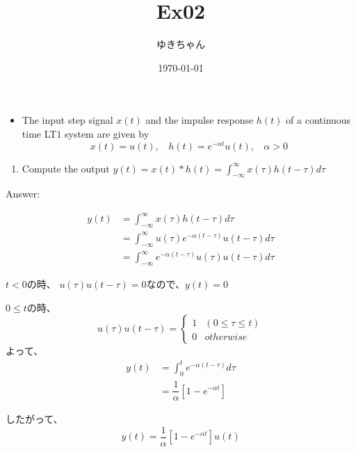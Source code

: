 \documentclass[a4paper,16pt]{jsarticle}
\title{Ex02}
\author{ゆきちゃん}
\date{\today}
\begin{document}
\maketitle

\begin{itemize}
	\item The input step signal $x(t)$ and the impulse response $h(t)$ of a continuous time LT$1$ system are given by
	\begin{equation}
		x(t) = u(t),~~~~h(t) = e^{-\alpha t}u(t),~~~~\alpha > 0
	\end{equation}
\end{itemize}

\begin{enumerate}
	\item Compute the output $y(t) = x(t)*h(t) = \int_{-\infty}^\infty x(\tau)h(t-\tau) d\tau$
\end{enumerate}

Answer:

\begin{align}
	y(t) &= \int_{-\infty}^\infty x(\tau)h(t-\tau) d\tau \\
	&= \int_{-\infty}^\infty u(\tau)e^{-\alpha (t-\tau)}u(t-\tau) d\tau \\
	&= \int_{-\infty}^\infty e^{-\alpha (t-\tau)}u(\tau)u(t-\tau) d\tau
\end{align}

$t < 0$の時、
$u(\tau)u(t-\tau) = 0$なので、$y(t) = 0$

$0 \leq t$の時、
\begin{equation*}
	u(\tau)u(t-\tau) =
	\begin{cases}
		1 & (0 \leq \tau \leq t) \\
		0 & otherwise
	\end{cases}
\end{equation*}
よって、
\begin{align}
	y(t) &= \int_0^t e^{-\alpha (t-\tau)} d\tau \\
	&= \dfrac{1}{\alpha}[ 1 - e^{-\alpha t}]
\end{align}

したがって、
\begin{equation}
	y(t) = \dfrac{1}{\alpha}[ 1 - e^{-\alpha t}]u(t)
\end{equation}
\end{document}
